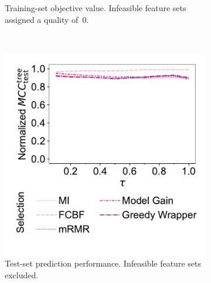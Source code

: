 \documentclass{article}
\theoremstyle{definition}
\begin{document}
\begin{figure}[htbp]
\begin{subfigure}[t]{0.48\textwidth}
		\caption{
			Training-set objective value.
			Infeasible feature sets assigned a quality of~0.
		}
		\label{fig:afs:impact-tau-fs-method-train-objective-max-fillna}
	\end{subfigure}
	\\ \vspace{\baselineskip}
	\begin{subfigure}[t]{0.48\textwidth}
		\centering
		\includegraphics[width=\textwidth, trim=20 40 15 15, clip]{plots/afs-impact-tau-fs-method-decision-tree-test-mcc-max.pdf}
		\caption{
			Test-set prediction performance.
			Infeasible feature sets excluded.
		}
		\label{fig:afs:impact-tau-fs-method-decision-tree-test-mcc-max}
	\end{subfigure}
	\hfill
	\begin{subfigure}[t]{0.48\textwidth}
		\centering

\end{subfigure}
\end{figure}
\end{document}
